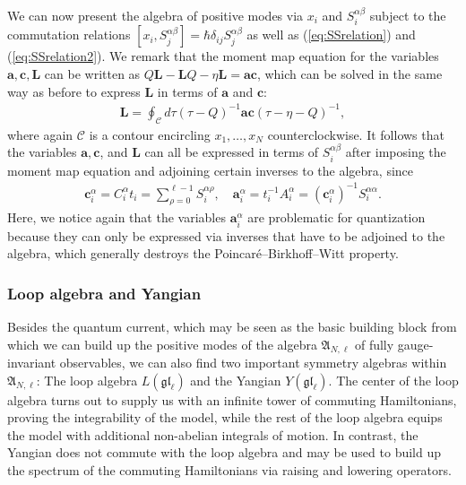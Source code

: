 \begin{remark}\label{rem:physSpinVars}
We can now present the algebra of positive modes via $x_i$ and $S_i^{\alpha\beta}$ subject to the commutation relations $[x_i, S_j^{\alpha\beta}] = \hbar\delta_{ij} S_j^{\alpha\beta}$ as well as (\ref{eq:SSrelation}) and (\ref{eq:SSrelation2}). We remark that the moment map equation for the variables $\mathbf{a},\mathbf{c},\mathbf{L}$ can be written as $Q\mathbf{L}-\mathbf{L}Q-\eta\mathbf{L} = \mathbf{a}\mathbf{c}$, which can be solved in the same way as before to express $\mathbf{L}$ in terms of $\mathbf{a}$ and $\mathbf{c}$:
\begin{align}
\mathbf{L} = \oint_\mathcal{C} d\tau (\tau-Q)^{-1} \mathbf{a} \mathbf{c} (\tau-\eta-Q)^{-1},
\end{align}
where again $\mathcal{C}$ is a contour encircling $x_1,\dots,x_N$ counterclockwise. It follows that the variables $\mathbf{a},\mathbf{c}$, and $\mathbf{L}$ can all be expressed in terms of $S_i^{\alpha\beta}$ after imposing the moment map equation and adjoining certain inverses to the algebra, since
\begin{align}
\mathbf{c}_i^\alpha = C_i^\alpha t_i = \sum_{\rho=0}^{\ell-1} S_i^{\alpha\rho}, \quad \mathbf{a}_i^\alpha = t_i^{-1} A_i^\alpha = (\mathbf{c}_i^\alpha)^{-1} S_i^{\alpha\alpha}.
\end{align}
Here, we notice again that the variables $\mathbf{a}_i^\alpha$ are problematic for quantization because they can only be expressed via inverses that have to be adjoined to the algebra, which generally destroys the Poincaré--Birkhoff--Witt property.
\end{remark}

\subsubsection{Loop algebra and Yangian}

Besides the quantum current, which may be seen as the basic building block from which we can build up the positive modes of the algebra $\mathfrak{A}_{N,\ell}$ of fully gauge-invariant observables, we can also find two important symmetry algebras within $\mathfrak{A}_{N,\ell}$: The loop algebra $L(\mathfrak{gl}_\ell)$ and the Yangian $Y(\mathfrak{gl}_\ell)$. The center of the loop algebra turns out to supply us with an infinite tower of commuting Hamiltonians, proving the integrability of the model, while the rest of the loop algebra equips the model with additional non-abelian integrals of motion. In contrast, the Yangian does not commute with the loop algebra and may be used to build up the spectrum of the commuting Hamiltonians via raising and lowering operators.

